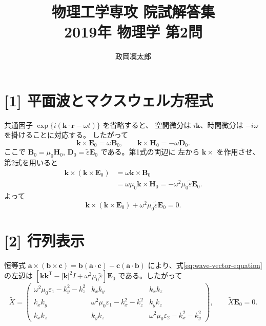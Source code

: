 \documentclass[11pt,a4paper]{article}
\title{物理工学専攻 院試解答集\\2019年 物理学 第2問}
\author{政岡凜太郎}
\date{}
\begin{document}
\maketitle

\section*{[1] 平面波とマクスウェル方程式}
共通因子 $\exp\{i(\boldsymbol{k}\cdot\boldsymbol{r}-\omega t)\}$ を省略すると、
空間微分は $i\boldsymbol{k}$、時間微分は $-i\omega$ を掛けることに対応する。
したがって
\begin{equation}
  \boldsymbol{k}\times\boldsymbol{E}_0=\omega\boldsymbol{B}_0,
  \qquad
  \boldsymbol{k}\times\boldsymbol{H}_0=-\omega\boldsymbol{D}_0.
  \label{eq:maxwell-wave}
\end{equation}
ここで $\boldsymbol{B}_0=\mu_0\boldsymbol{H}_0$,
$\boldsymbol{D}_0=\tilde{\varepsilon}\boldsymbol{E}_0$ である。第1式の両辺に
左から $\boldsymbol{k}\times$ を作用させ、第2式を用いると
\begin{align}
 \boldsymbol{k}\times(\boldsymbol{k}\times\boldsymbol{E}_0)
 &=\omega\boldsymbol{k}\times\boldsymbol{B}_0\\
 &=\omega\mu_0\boldsymbol{k}\times\boldsymbol{H}_0
 =-\omega^2\mu_0\tilde{\varepsilon}\boldsymbol{E}_0.
\end{align}
よって
\begin{equation}
  \boldsymbol{k}\times(\boldsymbol{k}\times\boldsymbol{E}_0)
  +\omega^2\mu_0\tilde{\varepsilon}\boldsymbol{E}_0=0.
  \label{eq:wave-vector-equation}
\end{equation}

\section*{[2] 行列表示}
恒等式 $\boldsymbol{a}\times(\boldsymbol{b}\times\boldsymbol{c})
=\boldsymbol{b}(\boldsymbol{a}\cdot\boldsymbol{c})-\boldsymbol{c}(\boldsymbol{a}\cdot\boldsymbol{b})$
により、式\eqref{eq:wave-vector-equation}の左辺は
$[\boldsymbol{k}\boldsymbol{k}^{\mathsf T}-|\boldsymbol{k}|^2I+\omega^2\mu_0\tilde{\varepsilon}]\boldsymbol{E}_0$
である。したがって
\begin{equation}
 \tilde X=
 \begin{pmatrix}
  \omega^2\mu_0\varepsilon_1-k_y^2-k_z^2&k_xk_y&k_xk_z\\
  k_xk_y&\omega^2\mu_0\varepsilon_1-k_x^2-k_z^2&k_yk_z\\
  k_xk_z&k_yk_z&\omega^2\mu_0\varepsilon_2-k_x^2-k_y^2
 \end{pmatrix},
 \qquad \tilde X\boldsymbol{E}_0=0.
 \label{eq:X}
\end{equation}
\end{document}
